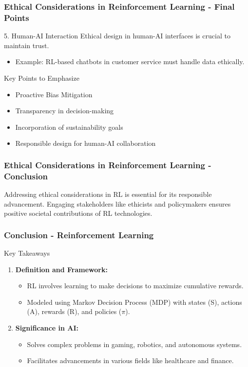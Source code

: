 \documentclass[aspectratio=169]{beamer}
\begin{document}
\begin{frame}[fragile]
    \frametitle{Ethical Considerations in Reinforcement Learning - Final Points}
    \begin{block}{5. Human-AI Interaction}
        Ethical design in human-AI interfaces is crucial to maintain trust.
        \begin{itemize}
            \item Example: RL-based chatbots in customer service must handle data ethically.
        \end{itemize}
    \end{block}
    
    \begin{block}{Key Points to Emphasize}
        \begin{itemize}
            \item Proactive Bias Mitigation
            \item Transparency in decision-making
            \item Incorporation of sustainability goals
            \item Responsible design for human-AI collaboration
        \end{itemize}
    \end{block}
\end{frame}

\begin{frame}[fragile]
    \frametitle{Ethical Considerations in Reinforcement Learning - Conclusion}
    Addressing ethical considerations in RL is essential for its responsible advancement. Engaging stakeholders like ethicists and policymakers ensures positive societal contributions of RL technologies.
\end{frame}

\begin{frame}[fragile]
    \frametitle{Conclusion - Reinforcement Learning}
    \begin{block}{Key Takeaways}
        \begin{enumerate}
            \item \textbf{Definition and Framework:}
            \begin{itemize}
                \item RL involves learning to make decisions to maximize cumulative rewards.
                \item Modeled using Markov Decision Process (MDP) with states (S), actions (A), rewards (R), and policies ($\pi$).
            \end{itemize}
            \item \textbf{Significance in AI:}
            \begin{itemize}
                \item Solves complex problems in gaming, robotics, and autonomous systems.
                \item Facilitates advancements in various fields like healthcare and finance.
            \end{itemize}
        \end{enumerate}
    \end{block}
\end{frame}
\end{document}

